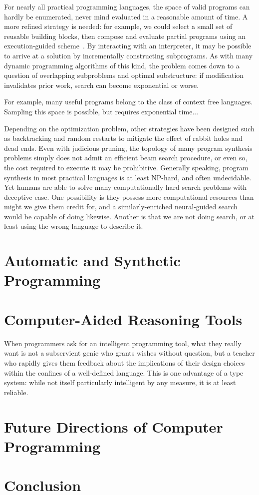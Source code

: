 \documentclass[10pt]{article}
\begin{document}
For nearly all practical programming languages, the space of valid programs can hardly be enumerated, never mind evaluated in a reasonable amount of time. A more refined strategy is needed: for example, we could select a small set of reusable building blocks, then compose and evaluate partial programs using an execution-guided scheme~\cite{chen2018execution, wang2018execution}. By interacting with an interpreter, it may be possible to arrive at a solution by incrementally constructing subprograms. As with many dynamic programming algorithms of this kind, the problem comes down to a question of overlapping subproblems and optimal substructure: if modification invalidates prior work, search can become exponential or worse.

For example, many useful programs belong to the class of context free languages. Sampling this space is possible, but requires exponential time...

Depending on the optimization problem, other strategies have been designed such as backtracking and random restarts to mitigate the effect of rabbit holes and dead ends. Even with judicious pruning, the topology of many program synthesis problems simply does not admit an efficient beam search procedure, or even so, the cost required to execute it may be prohibitive. Generally speaking, program synthesis in most practical languages is at least NP-hard, and often undecidable. Yet humans are able to solve many computationally hard search problems with deceptive ease. One possibility is they possess more computational resources than might we give them credit for, and a similarly-enriched neural-guided search would be capable of doing likewise. Another is that we are not doing search, or at least using the wrong language to describe it.

  \section{Automatic and Synthetic Programming}



  \section{Computer-Aided Reasoning Tools}

When programmers ask for an intelligent programming tool, what they really want is not a subservient genie who grants wishes without question, but a teacher who rapidly gives them feedback about the implications of their design choices within the confines of a well-defined language. This is one advantage of a type system: while not itself particularly intelligent by any measure, it is at least reliable.

  \section{Future Directions of Computer Programming}

  \section{Conclusion}

  
  
\end{document}
